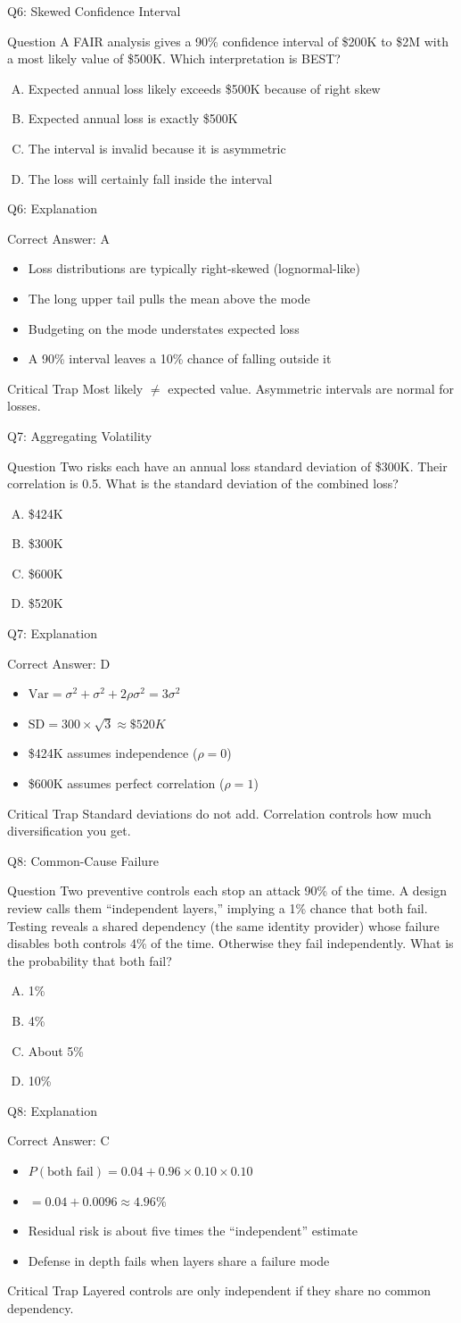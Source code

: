 \documentclass[aspectratio=169]{beamer}
\newcommand{\hq}[7]{%
  \begin{frame}{Q#1: #2}
    \begin{block}{Question}
      #3
    \end{block}
    \begin{enumerate}[(A)]
      #4
    \end{enumerate}
  \end{frame}
  \begin{frame}{Q#1: Explanation}
    \begin{block}{Correct Answer: #5}
      \begin{itemize}
        #6
      \end{itemize}
    \end{block}
    \begin{alertblock}{Critical Trap}
      #7
    \end{alertblock}
  \end{frame}
}
\begin{document}
\hq{6}{Skewed Confidence Interval}
{A FAIR analysis gives a 90\% confidence interval of \$200K to \$2M with a most likely value of \$500K. Which interpretation is BEST?}
{\item Expected annual loss likely exceeds \$500K because of right skew
 \item Expected annual loss is exactly \$500K
 \item The interval is invalid because it is asymmetric
 \item The loss will certainly fall inside the interval}
{A}
{\item Loss distributions are typically right-skewed (lognormal-like)
 \item The long upper tail pulls the mean above the mode
 \item Budgeting on the mode understates expected loss
 \item A 90\% interval leaves a 10\% chance of falling outside it}
{Most likely $\neq$ expected value. Asymmetric intervals are normal for losses.}

\hq{7}{Aggregating Volatility}
{Two risks each have an annual loss standard deviation of \$300K. Their correlation is 0.5. What is the standard deviation of the combined loss?}
{\item \$424K
 \item \$300K
 \item \$600K
 \item \$520K}
{D}
{\item $\text{Var} = \sigma^2 + \sigma^2 + 2\rho\sigma^2 = 3\sigma^2$
 \item $\text{SD} = 300 \times \sqrt{3} \approx \$520K$
 \item \$424K assumes independence ($\rho = 0$)
 \item \$600K assumes perfect correlation ($\rho = 1$)}
{Standard deviations do not add. Correlation controls how much diversification you get.}

\hq{8}{Common-Cause Failure}
{Two preventive controls each stop an attack 90\% of the time. A design review calls them ``independent layers,'' implying a 1\% chance that both fail. Testing reveals a shared dependency (the same identity provider) whose failure disables both controls 4\% of the time. Otherwise they fail independently. What is the probability that both fail?}
{\item 1\%
 \item 4\%
 \item About 5\%
 \item 10\%}
{C}
{\item $P(\text{both fail}) = 0.04 + 0.96 \times 0.10 \times 0.10$
 \item $= 0.04 + 0.0096 \approx 4.96\%$
 \item Residual risk is about five times the ``independent'' estimate
 \item Defense in depth fails when layers share a failure mode}
{Layered controls are only independent if they share no common dependency.}
\end{document}
